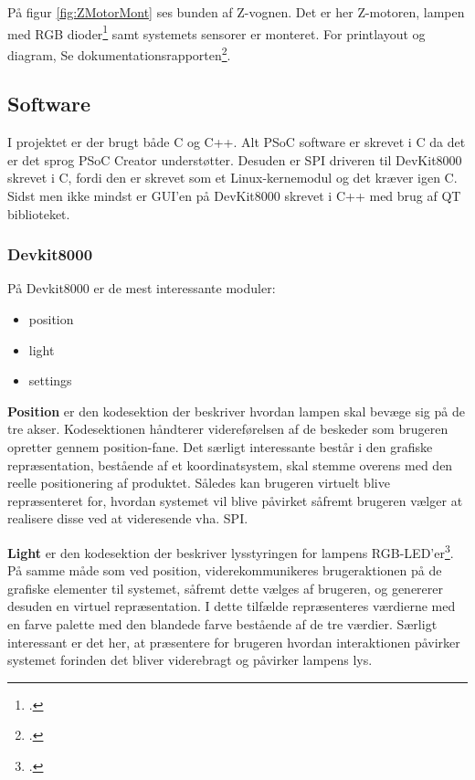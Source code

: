 På figur \ref{fig:ZMotorMont} ses bunden af Z-vognen. Det er her Z-motoren, lampen med RGB dioder\footcite{L-154A4} samt systemets sensorer er monteret. For printlayout og diagram, Se dokumentationsrapporten\footcite{documentation}.

\subsection{Software}

I projektet er der brugt både C og C++. Alt PSoC software er skrevet i C da det er det sprog PSoC Creator understøtter. Desuden er SPI driveren til DevKit8000 skrevet i C, fordi den er skrevet som et Linux-kernemodul og det kræver igen C. Sidst men ikke mindst er GUI'en på DevKit8000 skrevet i C++ med brug af QT biblioteket.

\subsubsection{Devkit8000}

På Devkit8000 er de mest interessante moduler:

\begin{itemize}
	\item position
	\item light
	\item settings
\end{itemize}

\textbf{Position} er den kodesektion der beskriver hvordan lampen skal bevæge sig på de tre akser. Kodesektionen håndterer videreførelsen af de beskeder som brugeren opretter gennem position-fane. Det særligt interessante består i den grafiske repræsentation, bestående af et koordinatsystem, skal stemme overens med den reelle positionering af produktet. Således kan brugeren virtuelt blive repræsenteret for, hvordan systemet vil blive påvirket såfremt brugeren vælger at realisere disse ved at videresende vha. SPI.

\textbf{Light} er den kodesektion der beskriver lysstyringen for lampens RGB-LED'er\footcite{L-154A4}. På samme måde som ved position, viderekommunikeres brugeraktionen på de grafiske elementer til systemet, såfremt dette vælges af brugeren, og genererer desuden en virtuel repræsentation. I dette tilfælde repræsenteres værdierne med en farve palette med den blandede farve bestående af de tre værdier. Særligt interessant er det her, at præsentere for brugeren hvordan interaktionen påvirker systemet forinden det bliver viderebragt og påvirker lampens lys.

